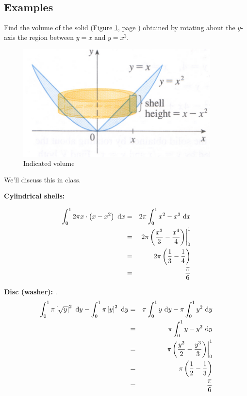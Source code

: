 \documentclass[12pt,addpoints, answers, fleqn]{exam}
\begin{document}
\subsection{Examples}
\begin{questions}
\question Find the volume of the solid (Figure \ref{fig:graph3112}, page \pageref{fig:graph3112}) obtained by rotating about the $y$-axis the region between $y=x$ and $y=x^2$.

\begin{figure}[htbp] %
   \centering
   \includegraphics[width=4in]{./graphics/graph3112.pdf} 
   \caption{Indicated volume}
   \label{fig:graph3112}
\end{figure}

\begin{solution}
We'll discuss this in class.

\textbf{Cylindrical shells:} 

\begin{eqnarray*}
\int_0^1 2 \pi x \cdot \left( x - x^2 \right) \ {\rm{d}}x &=& 2 \pi  \int_0^1  x^2 - x^3 \ {\rm{d}} x\\
&=& \left. 2 \pi  \left(  \frac{x^3}{3} - \frac{x^4}{4} \right) \right|_0^1\\
&=&  2 \pi  \left(  \frac{1}{3} - \frac{1}{4} \right)\\
&=&  \frac{\pi}{6}
\end{eqnarray*}



\textbf{Disc (washer):} .
\begin{eqnarray*}
\int_0^1  \pi \left[\sqrt{y}\right]^2  \ {\rm{d}}y - \int_0^1  \pi \left[y\right]^2  \ {\rm{d}} y &=&  \pi \int_0^1   y  \ {\rm{d}}y - \pi \int_0^1   y^2  \ {\rm{d}}y\\
 &=&  \pi \int_0^1   y - y^2  \ {\rm{d}}y \\
&=&  \left. \pi  \left(  \frac{y^2}{2} - \frac{y^3}{3} \right) \right|_0^1\\
&=&  \pi  \left(  \frac{1}{2} - \frac{1}{3} \right)\\
&=&  \frac{\pi}{6}
\end{eqnarray*}


\end{solution}

\end{questions}
\end{document}
